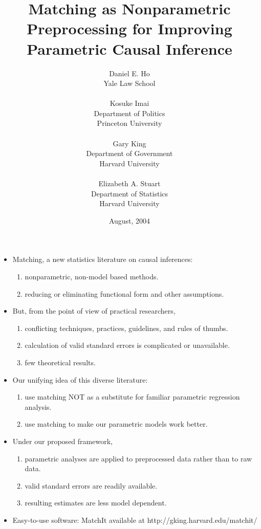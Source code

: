 \documentclass[20pt,landscape,pdftex]{foils}
\title{Matching as Nonparametric Preprocessing for Improving
  Parametric Causal Inference}
\date{August, 2004}
\author{Daniel E. Ho \\
  Yale Law School\\
  \\
  Kosuke Imai\\
  Department of Politics\\ Princeton University \\
  \\ 
  Gary King\\
  Department of Government\\ Harvard University\\
  \\
  Elizabeth A. Stuart\\
  Department of Statistics\\ Harvard University
\mbox{}\pdfbookmark{TitlePage}{stlab0}}
\begin{document}
\color{black}
\LOGOOFF
\maketitle



\hypersetup{pdfpagetransition=Replace}

\begin{itemize}
\item Matching, a new statistics literature on causal inferences:\pause
  \begin{enumerate}
  \item nonparametric, non-model based methods.\pause
  \item reducing or eliminating functional form and other assumptions.\pause
  \end{enumerate}
  
\item But, from the point of view of practical researchers,\pause
  \begin{enumerate}    
  \item conflicting techniques, practices, guidelines, and rules of thumbs. \pause
  \item calculation of valid standard errors is complicated or
    unavailable.\pause
  \item few theoretical results.\pause
  \end{enumerate}

\item Our unifying idea of this diverse literature:\pause 
  \begin{enumerate}
  \item use matching NOT as a substitute for familiar parametric
    regression analysis.\pause
  \item use matching to make our parametric models work better.\pause
  \end{enumerate}

\item Under our proposed framework,\pause
  \begin{enumerate}
  \item parametric analyses are applied to preprocessed data rather
    than to raw data.\pause
  \item valid standard errors are readily available.\pause
  \item resulting estimates are less model dependent.\pause
  \end{enumerate} 

\item Easy-to-use software: MatchIt available at http://gking.harvard.edu/matchit/
\end{itemize}



\hypersetup{pdfpagetransition=Replace}
\end{document}
